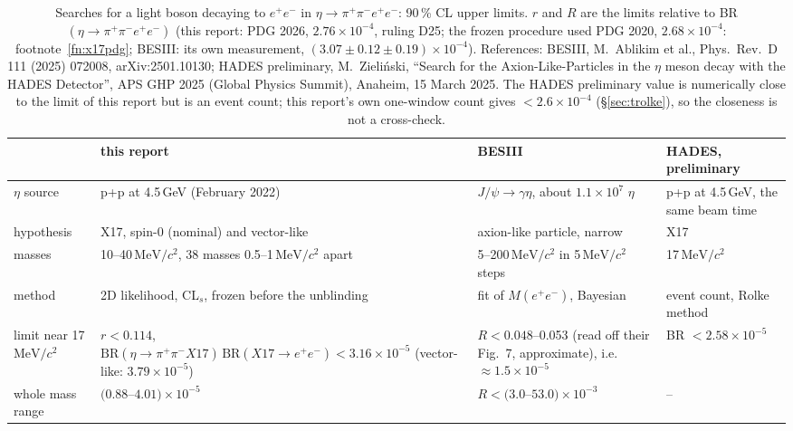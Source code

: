 \documentclass[11pt,a4paper]{article}
\newcommand{\ee}{\ensuremath{e^{+}e^{-}}\xspace}
\newcommand{\pipi}{\ensuremath{\pi^{+}\pi^{-}}\xspace}
\newcommand{\ppee}{\ensuremath{\pi^{+}\pi^{-}e^{+}e^{-}}\xspace}
\newcommand{\Mee}{\ensuremath{M(e^{+}e^{-})}\xspace}
\newcommand{\MeVcc}{\ensuremath{\mathrm{MeV}/c^{2}}\xspace}
\newcommand{\BRX}{\ensuremath{\mathrm{BR}(\eta\to\pipi X17)\,\mathrm{BR}(X17\to\ee)}\xspace}
\begin{document}
\begin{table}[H]
\centering
\caption{Searches for a light boson decaying to \ee in $\eta\to\pipi\ee$: 90\,\% CL upper limits. $r$ and $R$ are the limits relative to
BR$(\eta\to\ppee)$ (this report: PDG 2026, $2.76\times10^{-4}$, ruling D25; the frozen procedure used PDG 2020, $2.68\times10^{-4}$:
footnote~\ref{fn:x17pdg}; BESIII: its own measurement, $(3.07\pm0.12\pm0.19)\times10^{-4}$).
References: BESIII, M.~Ablikim et al., Phys.\ Rev.\ D 111 (2025) 072008, arXiv:2501.10130; HADES preliminary, M.~Zieli\'nski, ``Search for the
Axion-Like-Particles in the $\eta$ meson decay with the HADES Detector'', APS GHP 2025 (Global Physics Summit), Anaheim, 15 March 2025.
The HADES preliminary value is numerically close to the limit of this report but is an event count; this report's own one-window count gives
$<2.6\times10^{-4}$ (\S\ref{sec:trolke}), so the closeness is not a cross-check.}
\label{tab:x17cmp}
\footnotesize
\begin{tabularx}{\textwidth}{@{}>{\raggedright\arraybackslash}p{2.5cm} L L L@{}}
\toprule
 & this report & BESIII & HADES, preliminary \\
\midrule
$\eta$ source & p+p at 4.5\,GeV (February 2022) & $J/\psi\to\gamma\eta$, about $1.1\times10^7$ $\eta$ & p+p at 4.5\,GeV, the same beam time \\
hypothesis & X17, spin-0 (nominal) and vector-like & axion-like particle, narrow & X17 \\
masses & 10--40\,\MeVcc, 38 masses 0.5--1\,\MeVcc apart & 5--200\,\MeVcc in 5\,\MeVcc steps & 17\,\MeVcc \\
method & 2D likelihood, CL$_s$, frozen before the unblinding & fit of \Mee, Bayesian & event count, Rolke method \\
limit near 17\,\MeVcc & $r<0.114$, $\BRX<3.16\times10^{-5}$ (vector-like: $3.79\times10^{-5}$) & $R<0.048$--0.053 (read off their Fig.~7, approximate),
i.e.\ $\approx1.5\times10^{-5}$ & BR $<2.58\times10^{-5}$ \\
whole mass range & $(0.88$--$4.01)\times10^{-5}$ & $R<(3.0$--$53.0)\times10^{-3}$ & -- \\
\bottomrule
\end{tabularx}
\end{table}
\end{document}
